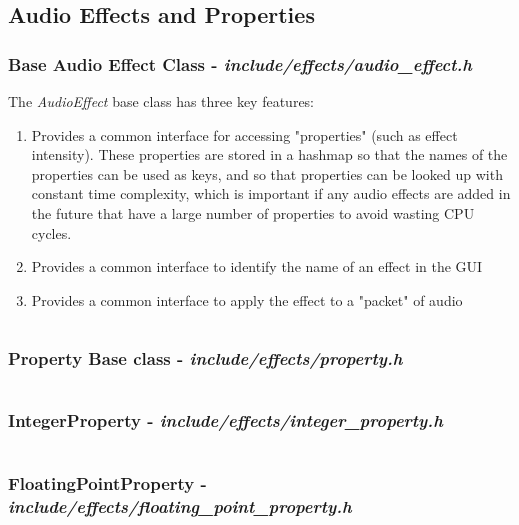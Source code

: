 \pagebreak
\subsection{Audio Effects and Properties}

\subsubsection{Base Audio Effect Class - \textit{include/effects/audio\_effect.h}}
The \textit{AudioEffect} base class has three key features:
\begin{enumerate}
	\item Provides a common interface for accessing "properties" (such as effect intensity). These properties are stored in a hashmap so that the names of the properties can be used as keys, and so that properties can be looked up with constant time complexity, which is important if any audio effects are added in the future that have a large number of properties to avoid wasting CPU cycles.
	\item Provides a common interface to identify the name of an effect in the GUI
	\item Provides a common interface to apply the effect to a "packet" of audio
\end{enumerate}
\inputminted[linenos]{c++}{../include/effects/audio_effect.h}

\pagebreak
\subsubsection{Property Base class - \textit{include/effects/property.h}}
\inputminted[linenos]{c++}{../include/effects/property.h}

\pagebreak
\subsubsection{IntegerProperty - \textit{include/effects/integer\_property.h}}
\inputminted[linenos]{c++}{../include/effects/integer_property.h}

\pagebreak
\subsubsection{FloatingPointProperty - \textit{include/effects/floating\_point\_property.h}}
\inputminted[linenos]{c++}{../include/effects/floating_point_property.h}


